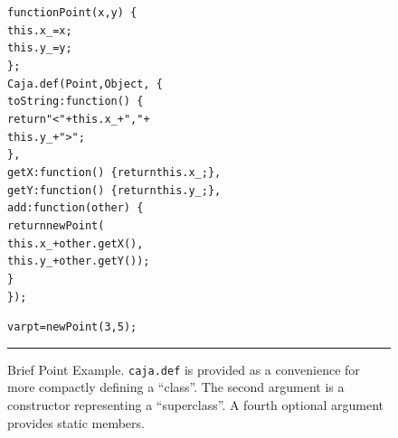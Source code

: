 \documentclass[letterpaper,twocolumn,10pt]{article}
\newcommand{\code}[1]{{\tt {#1}}}              %
\begin{document}
\begin{figure}[t!]
\begin{alltt}
function Point(x, y)\ \{
  this.x\_ = x;
  this.y\_ = y;
\};
Caja.def(Point, Object,\ \{
  toString: function()\ \{ 
    return "<" + this.x\_ + "," + 
                 this.y\_ + ">"; 
  \},
  getX: function()\ \{ return this.x\_; \},
  getY: function()\ \{ return this.y\_; \},
  add: function(other)\ \{
    return new Point(
      this.x\_ + other.getX(),
      this.y\_ + other.getY());
  \}
\});

var pt = new Point(3, 5);
\end{alltt}

\caption[Brief Point Example.]{Brief Point Example. \code{caja.def} is
provided as a convenience for more compactly defining a ``class''. The second
argument is a constructor representing a ``superclass''. A fourth optional
argument provides static members.
\\ } \hrule
\label{fig:brief-point}
\end{figure}
\end{document}
